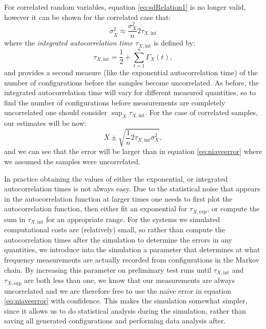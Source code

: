 \documentclass[12pt]{article}
\begin{document}
            For correlated random variables, equation \ref{eq:sdRelation1} is no longer valid, however it can be shown for the correlated case \cite{gattringer_lang_2013} that:
            \begin{equation}
                \sigma_{\overline{X}}^2 \approx \frac{\sigma_X^2}{n} 2 \tau_{X,\text{int}}
            \end{equation}
            where the \textit{integrated autocorrelation time} $\tau_{X,\text{int}}$ is defined by:
            \begin{equation}
                \label{eq:integratedAutocorrelation}
                \tau_{X,\text{int}} = \frac{1}{2} + \sum_{t=1}^{n}\Gamma_{X}\left(t\right),
            \end{equation}
            and provides  a second measure (like the exponential autocorrelation time) of the number of configurations before the samples become uncorrelated. As before, the integrated autocorrelation time will vary for different measured quantities, so to find the number of configurations before measurements are completely uncorrelated one should consider $\sup_X{\tau_{X,\text{int}}}$. 
            For the case of correlated samples, our estimates will be now:
            \begin{equation}
                \label{eq:trueEstimate}
                \overline{X}\pm\sqrt{\frac{1}{n}2\tau_{X,\text{int}}\overline{\sigma}^{2}_{X}},
            \end{equation}
            and we can see that the error will be larger than in equation \ref{eq:niaveerror} where we assumed the samples were uncorrelated. 

            In practice obtaining the values of either the exponential, or integrated autocorrelation times is not always easy. Due to the statistical noise that appears in the autocorrelation function at larger times one needs to first plot the autocorrelation function, then either fit an exponential for $\tau_{X,\text{exp}}$, or compute the sum in $\tau_{X,\text{int}}$ for an appropriate range. For the systems we simulated computational costs are (relatively) small, so rather than compute the autocorrelation times after the simulation to determine the errors in any quantities, we introduce into the simulation a parameter that determines at what frequency measurements are actually recorded from configurations in the Markov chain. By increasing this parameter on preliminary test runs until $\tau_{X,\text{int}}$ and $\tau_{X,\text{exp}}$ are both less than one, we know that our measurements are always uncorrelated and we are therefore free to use the naive error in equation \ref{eq:niaveerror} with confidence. This makes the simulation somewhat simpler, since it allows us to do statistical analysis during the simulation, rather than saving all generated configurations and performing data analysis after. 
\end{document}
